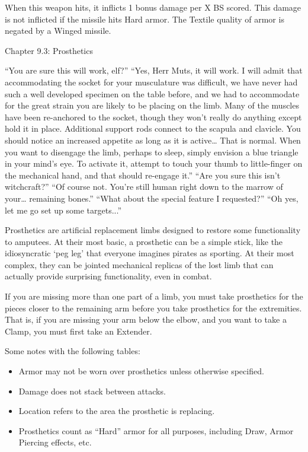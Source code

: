 \documentclass[oneside,11pt,english]{book}
\begin{document}
When this weapon hits, it inflicts 1 bonus damage per X BS scored. This damage is not inflicted if the 
missile hits Hard armor. The Textile quality of armor is negated by a Winged missile. 

 

Chapter 9.3: Prosthetics 

 

“You are sure this will work, elf?” 
“Yes, Herr Muts, it will work. I will admit that accommodating the socket for your musculature was difficult, we have never had 
such a well developed specimen on the table before, and we had to accommodate for the great strain you are likely to be placing 
on the limb. Many of the muscles have been re-anchored to the socket, though they won’t really do anything except hold it in 
place. Additional support rods connect to the scapula and clavicle. You should notice an increased appetite as long as it is 
active… That is normal. When you want to disengage the limb, perhaps to sleep, simply envision a blue triangle in your mind’s 
eye. To activate it, attempt to touch your thumb to little-finger on the mechanical hand, and that should re-engage it.” 
“Are you sure this isn’t witchcraft?” 
“Of course not. You’re still human right down to the marrow of your… remaining bones.” 
“What about the special feature I requested?” 
“Oh yes, let me go set up some targets...” 

 

Prosthetics are artificial replacement limbs designed to restore some functionality to amputees. At their 
most basic, a prosthetic can be a simple stick, like the idiosyncratic ‘peg leg’ that everyone imagines 
pirates as sporting. At their most complex, they can be jointed mechanical replicas of the lost limb that 
can actually provide surprising functionality, even in combat. 

 

If you are missing more than one part of a limb, you must take prosthetics for the pieces closer to the 
remaining arm before you take prosthetics for the extremities. That is, if you are missing your arm below 
the elbow, and you want to take a Clamp, you must first take an Extender. 


 

Some notes with the following tables: 
\begin{itemize}
\item Armor may not be worn over prosthetics unless otherwise specified. 
\item Damage does not stack between attacks. 
\item Location refers to the area the prosthetic is replacing. 
\item Prosthetics count as “Hard” armor for all purposes, including Draw, Armor Piercing effects, etc. 
\end{itemize}
 
\end{document}
